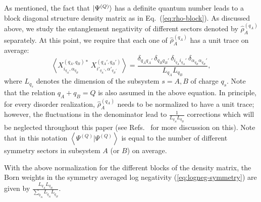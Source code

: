 \documentclass[aps,pra,reprint,superscriptaddress,twocolumn,notitlepage]{revtex4-1}
\numberwithin{equation}{section}
\begin{document}
As mentioned, the fact that $\ket{ \Psi^{(Q)}}$ has a definite quantum number leads to a block diagonal structure density matrix as in Eq.~(\ref{eq:rho-block}). 
As discussed above, we study the entanglement negativity of different sectors denoted by $\hat \rho_{A}^{(q_A)}$ separately.
At this point, we require that each one of $\hat \rho_{A}^{(q_A)}$ has a unit trace on average: 
\begin{equation}\label{eq:X_variance_correlation}
    \left\langle X_{i_{q_A}, \alpha_{q_B}}^{(q_A, q_B)\ast} \
    X_{i'_{q_A'}, \alpha'_{q_B'}}^{(q_A', q_B')} \right\rangle =  \frac{\delta_{q_A q_A'} \, \delta_{q_B q_B'} \, \delta_{i_{q_A} i_{q_A}'} \, \delta_{\alpha_{q_B} \alpha_{q_B}'}}{L_{q_A} L_{q_B} },
\end{equation}
where $L_{q_s}$ denotes the dimension of the subsystem $s= A,B$ of charge $q_s$. Note that the relation $q_A+q_B=Q$ is also assumed in the above equation.
In principle, for every disorder realization, $\hat \rho_{A}^{(q_{A})}$ needs to be normalized to have a unit trace; however, the fluctuations in the denominator lead to $\frac{1}{L_{q_A} L_{q_B} }$ corrections which will be neglected throughout this paper (see Refs.~\cite{ChenLudwig,Shapourian2021} for more discussion on this).
Note that in this notation $\left\langle \Psi^{(Q)}  \big| \Psi^{(Q)} \right\rangle$ is equal to the number of different symmetry sectors in subsystem $A$ (or $B$) on average.

With the above normalization for the different blocks of the density matrix, the Born weights in the symmetry averaged log negativity (\ref{eq:logneg-symmetry}) 
are given by $\frac{L_{q_A} L_{q_B}}{\sum_{\tilde{q}_{A}} L_{\tilde{q}_A } L_{\tilde{q}_B}  }$.
\end{document}
